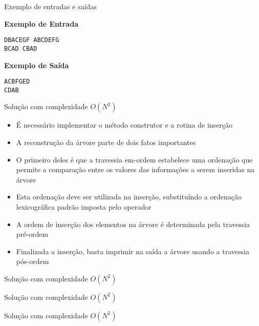 \begin{frame}[fragile]{Exemplo de entradas e saídas}

\begin{minipage}[t]{0.5\textwidth}
\textbf{Exemplo de Entrada}
\begin{verbatim}
DBACEGF ABCDEFG
BCAD CBAD
\end{verbatim}
\end{minipage}
\begin{minipage}[t]{0.45\textwidth}
\textbf{Exemplo de Saída}
\begin{verbatim}
ACBFGED
CDAB
\end{verbatim}
\end{minipage}
\end{frame}

\begin{frame}[fragile]{Solução com complexidade $O(N^2)$}

    \begin{itemize}
        \item É necessário implementar o método construtor e a rotina de inserção 

        \item A reconstrução da árvore parte de dois fatos importantes

        \item O primeiro deles é que a travessia em-ordem estabelece uma ordenação que permite
            a comparação entre os valores das informações a serem inseridas na árvore

        \item Esta ordenação deve ser utilizada na inserção, substituíndo a ordenação lexicográfica
            padrão imposta pelo operador 

        \item A ordem de inserção dos elementos na árvore é determinada pela travessia pré-ordem

        \item Finalizada a inserção, basta imprimir na saída a árvore usando a travessia pós-ordem
   \end{itemize}

\end{frame}

\begin{frame}[fragile]{Solução com complexidade $O(N^2)$}
\end{frame}

\begin{frame}[fragile]{Solução com complexidade $O(N^2)$}
\end{frame}

\begin{frame}[fragile]{Solução com complexidade $O(N^2)$}
\end{frame}

